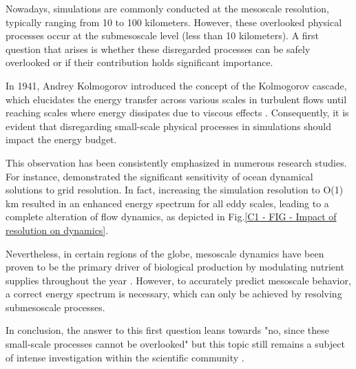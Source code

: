 \vspace{0.5em}

Nowadays, simulations are commonly conducted at the mesoscale resolution, typically ranging from 10 to 100 kilometers. However, these overlooked physical processes occur at the submesoscale level (less than 10 kilometers). A first question that arises is whether these disregarded processes can be safely overlooked or if their contribution holds significant importance.\\

\newpage

In 1941, Andrey Kolmogorov introduced the concept of the Kolmogorov cascade, which elucidates the energy transfer across various scales in turbulent flows until reaching scales where energy dissipates due to viscous effects \citep{KolmogorovKaskade}. Consequently, it is evident that disregarding small-scale physical processes in simulations should impact the energy budget.\\

\vspace{-0.42em}

This observation has been consistently emphasized in numerous research studies. For instance, \cite{InfluenceMesoscale1} demonstrated the significant sensitivity of ocean dynamical solutions to grid resolution. In fact, increasing the simulation resolution to O(1) km resulted in an enhanced energy spectrum for all eddy scales, leading to a complete alteration of flow dynamics, as depicted in Fig.\ref{C1 - FIG - Impact of resolution on dynamics}.\\

\vspace{-0.42em}

Nevertheless, in certain regions of the globe, mesoscale dynamics have been proven to be the primary driver of biological production by modulating nutrient supplies throughout the year \citep{InfluenceMesoscale2, InfluenceMesoscale3}. However, to accurately predict mesoscale behavior, a correct energy spectrum is necessary, which can only be achieved by resolving submesoscale processes.\\

\vspace{-0.42em}

In conclusion, the answer to this first question leans towards "no, since these small-scale processes cannot be overlooked" but this topic still remains a subject of intense investigation within the scientific community \citep{InfluenceMesoscale6, InfluenceMesoscale9, InfluenceMesoscale5, InfluenceMesoscale7, InfluenceMesoscale4, InfluenceMesoscale8}.\\

